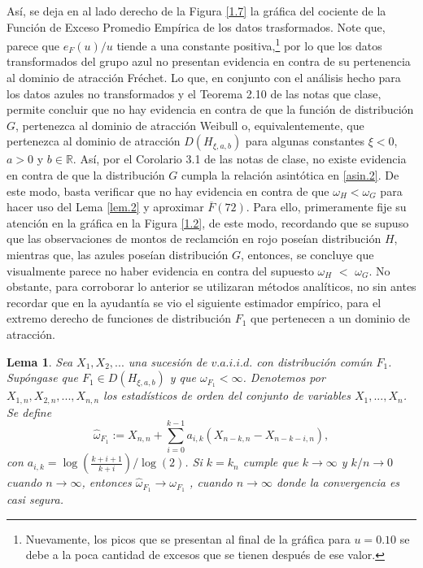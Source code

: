 \documentclass[10.5pt,notitlepage]{article}
\newcommand{\RR}{\mathbb{R}}
\theoremstyle{plain}
\newtheorem{lem}[thm]{Lema} %
\begin{document}
Así, se deja en al lado derecho de la Figura \ref{1.7} la gráfica del cociente de la Función de Exceso Promedio Empírica de los datos trasformados. Note que, parece que $e_F(u)/u$ tiende a una constante positiva,\footnote{Nuevamente, los picos que se presentan al final de la gráfica para $u=0.10$ se debe a la poca cantidad de excesos que se tienen después de ese valor.} por lo que los datos transformados del grupo azul no presentan evidencia en contra de su pertenencia al dominio de atracción Fréchet. Lo que, en conjunto con el análisis hecho para los datos azules no transformados y el Teorema 2.10 de las notas que clase, permite concluir que no hay evidencia en contra de que la función de distribución \(G\), pertenezca al dominio de atracción Weibull o, equivalentemente, que pertenezca al dominio de atracción \(D(H_{\xi,a, b})\) para algunas constantes \(\xi < 0\), \(a > 0\) y \(b \in \RR\). Así, por el Corolario 3.1 de las notas de clase, no existe evidencia en contra de que la distribución \(G\) cumpla la relación asintótica en \eqref{asin.2}. De este modo, basta verificar que no hay evidencia en contra de que \(\omega_H < \omega_G\) para hacer uso del Lema \ref{lem.2} y aproximar \(\overline{F}(72)\). Para ello, primeramente fije su atención en la gráfica en la Figura \ref{1.2}, de este modo, recordando que se supuso que las observaciones de montos de reclamción en rojo poseían distribución \(H\), mientras que, las azules poseían distribución \(G\), entonces, se concluye que visualmente parece no haber evidencia en contra del supuesto  $\omega_H$ $<$ $\omega_G$. No obstante, para corroborar lo anterior se utilizaran métodos analíticos, no sin antes recordar que en la ayudantía se vio el siguiente estimador empírico, para el extremo derecho de funciones de distribución $F_1$ que pertenecen a un dominio de atracción.
\begin{lem}
Sea $X_1, X_2,...$ una sucesión de $v.a.i.i.d.$ con distribución común $F_1$. Supóngase que $F_1 \in
D(H_{\xi,a,b})$ y que $\omega_{F_1} < \infty$. Denotemos por $X_{1,n}, X_{2,n},..., X_{n,n}$ los estadísticos de orden del conjunto de variables
$X_1,..., X_n$. Se define
\[\hat{\omega}_{F_1}:=X_{n,n}+\sum_{i=0}^{k-1}a_{i,k}(X_{n-k,n}-X_{n-k-i,n}),\]
con $a_{i,k}=\log\left ( \frac{k+i+1}{k+i} \right )/\log(2)$. Si $k = k_n$ cumple que $k\to \infty$ y $k/n \to 0$ cuando $n \to \infty$, entonces
$\hat{\omega}_{F_1} \to \omega_{F_1}$ , cuando $n \to \infty$
donde la convergencia es casi segura. \label{lem4}
\end{lem}
\end{document}

